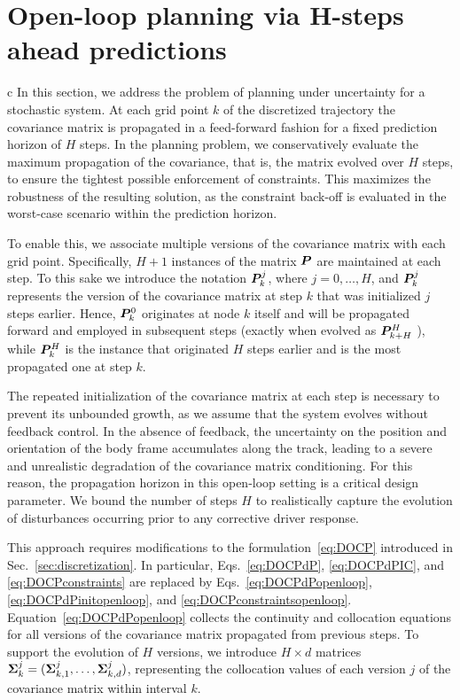 \section{Open-loop planning via H-steps ahead predictions}
c In this section, we address the problem of planning under uncertainty for a stochastic system.
At each grid point $k$ of the discretized trajectory the covariance matrix is propagated in a feed-forward fashion for a fixed prediction horizon of $H$ steps.
In the planning problem, we conservatively evaluate the maximum propagation of the covariance, that is, the matrix evolved over $H$ steps, to ensure the tightest possible enforcement of constraints. This maximizes the robustness of the resulting solution, as the constraint back-off is evaluated in the worst-case scenario within the prediction horizon.

To enable this, we associate multiple versions of the covariance matrix with each grid point. Specifically, $H+1$ instances of the matrix $\boldsymbol{P}$ are maintained at each step. To this sake we introduce the notation $\boldsymbol{P}_k^j$, where $j = 0, \ldots, H$, and $\boldsymbol{P}_k^j$ represents the version of the covariance matrix at step $k$ that was initialized $j$ steps earlier. Hence, $\boldsymbol{P}_k^0$ originates at node $k$ itself and will be propagated forward and employed in subsequent steps (exactly when evolved as $\boldsymbol{P}_{k+H}^H$ ), while $\boldsymbol{P}_k^H$ is the instance that originated $H$ steps earlier and is the most propagated one at step $k$.

The repeated initialization of the covariance matrix at each step is necessary to prevent its unbounded growth, as we assume that the system evolves without feedback control.
In the absence of feedback, the uncertainty on the position and orientation of the body frame accumulates along the track, leading to a severe and unrealistic degradation of the covariance matrix conditioning.
For this reason, the propagation horizon in this open-loop setting is a critical design parameter.
We bound the number of steps $H$ to realistically capture the evolution of disturbances occurring prior to any corrective driver response.

This approach requires modifications to the formulation~\eqref{eq:DOCP} introduced in Sec.~\ref{sec:discretization}. In particular, Eqs.~\eqref{eq:DOCPdP}, \eqref{eq:DOCPdPIC}, and \eqref{eq:DOCPconstraints} are replaced by Eqs.~\eqref{eq:DOCPdPopenloop}, \eqref{eq:DOCPdPinitopenloop}, and \eqref{eq:DOCPconstraintsopenloop}. Equation~\eqref{eq:DOCPdPopenloop} collects the continuity and collocation equations for all versions of the covariance matrix propagated from previous steps. To support the evolution of $H$ versions, we introduce $H \times d$ matrices $\boldsymbol{\Sigma}_k^j = (\boldsymbol{\Sigma}_{k,1}^j, \ldots, \boldsymbol{\Sigma}_{k,d}^j)$, representing the collocation values of each version $j$ of the covariance matrix within interval $k$.


